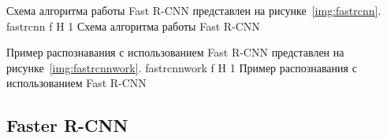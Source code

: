 \clearpage
Схема алгоритма работы Fast R-CNN представлен на рисунке~\ref{img:fastrcnn}.
	{fastrcnn}
	{f}
	{H}
	{1\textwidth}
	{Схема алгоритма работы Fast R-CNN}

Пример распознавания с использованием Fast R-CNN представлен на рисунке~\ref{img:fastrcnnwork}.
	{fastrcnnwork}
	{f}
	{H}
	{1\textwidth}
	{Пример распознавания с использованием Fast R-CNN}

\clearpage

\subsection{Faster R-CNN}
